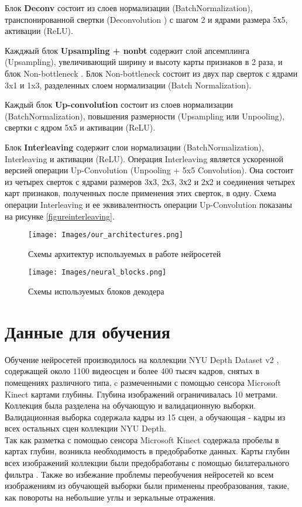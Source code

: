 \documentclass{mipt-thesis-bs}
\begin{document}
Блок \textbf{Deconv} состоит из слоев нормализации (BatchNormalization), транспонированной свертки (Deconvolution \cite{zeiler2010deconvolutional}) с шагом 2 и ядрами размера 5х5, активации (ReLU).

Кажджый блок \textbf{Upsampling + nonbt} содержит слой апсемплинга (Upsampling), увеличивающий ширину и высоту карты признаков в 2 раза, и блок Non-bottleneck \cite{romera2017erfnet}. Блок Non-bottleneck состоит из двух пар сверток с ядрами 3x1 и 1x3, разделенных слоем нормализации (Batch Normalization).

Каждый блок \textbf{Up-convolution} состоит из слоев нормализации (BatchNormalization), повышения размерности (Upsampling или Unpooling), свертки с ядром 5х5 и активации (ReLU). 

Блок \textbf{Interleaving} содержит слои нормализации (BatchNormalization), Interleaving \cite{laina2016deeper} и активации (ReLU). Операция Interleaving является ускоренной версией операции Up-Convolution (Unpooling + 5x5 Convolution). Она состоит из четырех сверток с ядрами размеров 3х3, 2х3, 3х2 и 2х2 и соединения четырех карт признаков, полученных после применения этих сверток, в одну. Схема операции Interleaving и ее эквивалентность операции Up-Convolution показаны на рисунке \ref{figureinterleaving}.

\begin{figure}
	\centering
	\texttt{[image: Images/our\_architectures.png]}
	\caption{Схемы архитектур используемых в работе нейросетей}
	\label{figurenetworks}
\end{figure}

\begin{figure}
	\centering
	\texttt{[image: Images/neural\_blocks.png]}
	\caption{Схемы используемых блоков декодера}
	\label{figureblocks}
\end{figure}

\section{Данные для обучения}

Обучение нейросетей производилось на коллекции NYU Depth Dataset v2 \cite{silberman2011indoor}, содержащей около 1100 видеосцен и более 400 тысяч кадров, снятых в помещениях различного типа, c размеченными с помощью сенсора Microsoft Kinect картами глубины. Глубина изображений ограничивалась 10 метрами. Коллекция была разделена на обучающую и валидационную выборки. Валидационная выборка содержала кадры из 15 сцен, а обучающая - кадры из всех остальных сцен коллекции NYU Depth.\\
Так как разметка с помощью сенсора Microsoft Kinect содержала пробелы в картах глубин, возникла необходимость в предобработке данных. Карты глубин всех изображений коллекции были предобработаны с помощью билатерального фильтра \cite{tomasi1998bilateral}. Также во избежание проблемы переобучения нейросетей ко всем изображениям из обучающей выборки были применены преобразования, такие, как повороты на небольшие углы и зеркальные отражения.
\end{document}
